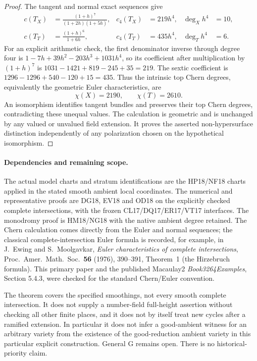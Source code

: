 \begin{proof}
The tangent and normal exact sequences give
\[
 \begin{aligned}
 c(T_X)&=\frac{(1+h)^7}{(1+2h)(1+5h)},&
                c_4(T_X)&=219h^4,&\deg_Xh^4&=10,\\
 c(T_T)&=\frac{(1+h)^6}{1+6h},&
                c_4(T_T)&=435h^4,&\deg_Th^4&=6.
 \end{aligned}
 \tag{CA18.11}\label{r18ca:chern}
\]
For an explicit arithmetic check, the first denominator
inverse through degree four is
$1-7h+39h^2-203h^3+1031h^4$, so its coefficient after
multiplication by $(1+h)^7$ is
$1031-1421+819-245+35=219$.
The sextic coefficient is
$1296-1296+540-120+15=435$.
Thus the intrinsic top Chern degrees, equivalently the
geometric Euler characteristics, are
\[
                   \chi(X)=2190,\qquad \chi(T)=2610.
 \tag{CA18.12}\label{r18ca:euler}
\]
An isomorphism identifies tangent bundles and preserves
their top Chern degrees, contradicting these unequal
values.  The calculation is geometric and is unchanged
by any valued or unvalued field extension.  It proves
the asserted non-hypersurface distinction independently
of any polarization chosen on the hypothetical isomorphism.
\end{proof}

\paragraph{Dependencies and remaining scope.}
The actual model charts and stratum identifications are the
HP18/NF18 charts applied in the stated smooth ambient local
coordinates.  The numerical and representative proofs are
DG18, EV18 and OD18 on the explicitly checked complete
intersections, with the frozen CL17/DQ17/ER17/VT17 interfaces.
The monodromy proof is HM18/NG18 with the native ambient
degree retained.  The Chern calculation comes directly
from the Euler and normal sequences; the classical
complete-intersection Euler formula is recorded, for
example, in J.~Ewing and S.~Moolgavkar,
\emph{Euler characteristics of complete intersections},
Proc.\ Amer.\ Math.\ Soc.\ \textbf{56} (1976), 390--391,
Theorem~1 (the Hirzebruch formula).
This primary paper and the published Macaulay2
\emph{Book3264Examples}, Section 5.4.3, were checked for
the standard Chern/Euler convention.

The theorem covers the specified smoothings, not every
smooth complete intersection.  It does not supply a
number-field full-height assertion without checking all
other finite places, and it does not by itself treat
new cycles after a ramified extension.
In particular it does not infer a good-ambient witness
for an arbitrary variety from the existence of the
good-reduction ambient variety in this particular
explicit construction.  General G remains open.
There is no historical-priority claim.
